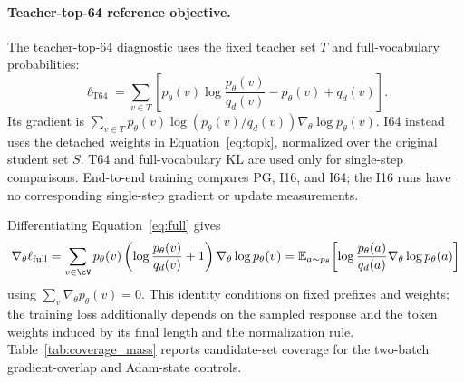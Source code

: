 \paragraph{Teacher-top-64 reference objective.}
The teacher-top-64 diagnostic uses the fixed teacher set $T$ and full-vocabulary probabilities:
\begin{equation}
\ell_{\mathrm{T64}}=\sum_{v\in T}\left[p_\theta(v)\log\frac{p_\theta(v)}{q_d(v)}-p_\theta(v)+q_d(v)\right].
\label{eq:t64}
\end{equation}
Its gradient is $\sum_{v\in T}p_\theta(v)\log(p_\theta(v)/q_d(v))\nabla_\theta\log p_\theta(v)$. I64 instead uses the detached weights in Equation~\ref{eq:topk}, normalized over the original student set $S$. T64 and full-vocabulary KL are used only for single-step comparisons. End-to-end training compares PG, I16, and I64; the I16 runs have no corresponding single-step gradient or update measurements.

Differentiating Equation~\ref{eq:full} gives
\begin{align}
\nabla_\theta\ell_{\mathrm{full}}
=\sum_{v\in\cV}p_\theta(v)\left(\log\frac{p_\theta(v)}{q_d(v)}+1\right)\nabla_\theta\log p_\theta(v)
=\mathbb E_{a\sim p_\theta}\!\left[\log\frac{p_\theta(a)}{q_d(a)}\nabla_\theta\log p_\theta(a)\right]
\end{align}
using $\sum_v\nabla_\theta p_\theta(v)=0$. This identity conditions on fixed prefixes and weights; the training loss additionally depends on the sampled response and the token weights induced by its final length and the normalization rule. Table~\ref{tab:coverage_mass} reports candidate-set coverage for the two-batch gradient-overlap and Adam-state controls.

\begin{table}[t]
\caption{\textbf{The teacher top-64 set captures nearly all student probability mass in these controls.} Means over sampled prefixes; gradient norms use domain-specific inputs. Entropy is in nats, and 100\% may reflect rounding.}
\label{tab:coverage_mass}
\centering\small

\end{table}


